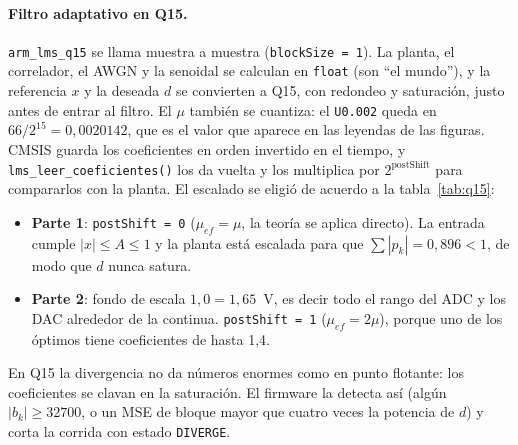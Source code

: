 \documentclass[11pt,a4paper]{article}
\newcommand{\lmsq}{\texttt{arm\_lms\_q15}}
\begin{document}
\paragraph{Filtro adaptativo en Q15.} \lmsq{} se llama muestra a muestra
(\texttt{blockSize = 1}). La planta, el correlador, el AWGN y la senoidal se calculan en
\texttt{float} (son ``el mundo''), y la referencia $x$ y la deseada $d$ se convierten a Q15, con
redondeo y saturación, justo antes de entrar al filtro. El $\mu$ también se cuantiza: el
\texttt{U0.002} queda en $66/2^{15} = 0{,}0020142$, que es el valor que aparece en las leyendas
de las figuras. CMSIS guarda los coeficientes en orden invertido en el tiempo, y
\texttt{lms\_leer\_coeficientes()} los da vuelta y los multiplica por $2^{\mathrm{postShift}}$ para
compararlos con la planta. El escalado se eligió de acuerdo a la tabla~\ref{tab:q15}:
\begin{itemize}
  \item \textbf{Parte 1}: \texttt{postShift = 0} ($\mu_{ef} = \mu$, la teoría se aplica directo).
  La entrada cumple $|x| \le A \le 1$ y la planta está escalada para que
  $\sum|p_k| = 0{,}896 < 1$, de modo que $d$ nunca satura.
  \item \textbf{Parte 2}: fondo de escala $1{,}0 = 1{,}65$~V, es decir todo el rango del
  ADC y los DAC alrededor de la continua. \texttt{postShift = 1} ($\mu_{ef} = 2\mu$), porque uno de
  los óptimos tiene coeficientes de hasta 1,4.
\end{itemize}
En Q15 la divergencia no da números enormes como en punto flotante: los coeficientes se clavan
en la saturación. El firmware la detecta así (algún $|b_k| \ge 32700$, o un MSE de bloque mayor
que cuatro veces la potencia de $d$) y corta la corrida con estado \texttt{DIVERGE}.
\end{document}

